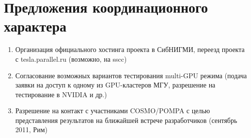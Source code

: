 \documentclass[a4,12pt]{report}
\begin{document}
\section{Предложения координационного характера}

\begin{enumerate}
\item Организация официального хостинга проекта в СибНИГМИ, переезд проекта с tesla.parallel.ru (возможно, на sscc)
\item Согласование возможных вариантов тестирования multi-GPU режима (подача заявки на доступ к одному из GPU-кластеров МГУ, разрешение на тестирование в NVIDIA и др.)
\item Разрешение на контакт с участниками COSMO/POMPA с целью представления результатов на ближайшей встрече разработчиков (сентябрь 2011, Рим)
\end{enumerate}
\end{document}
